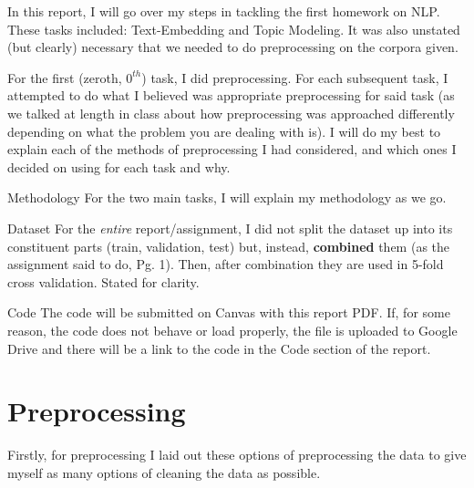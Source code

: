 \documentclass[12pt]{article}
\begin{document}
\maketitlepage

In this report, I will go over my steps in tackling the first homework on NLP. These tasks included: 
Text-Embedding and Topic Modeling. It was also unstated (but clearly) necessary that we needed to do 
preprocessing on the corpora given.

For the first (zeroth, $0^{th}$) task, I did preprocessing. For each subsequent task, I attempted to do what I 
believed was appropriate preprocessing for said task (as we talked at length in class about how 
preprocessing was approached differently depending on what the problem you are dealing with is). I will 
do my best to explain each of the methods of preprocessing I had considered, and which ones I decided on 
using for each task and why.

\begin{aside}{Methodology}
For the two main tasks, I will explain my methodology as we go. 
\end{aside}

\begin{important}{Dataset}
    For the \textit{entire} report/assignment, I did not split the dataset up into its constituent parts 
    (train, validation, test) but, instead, \textbf{combined} them (as the assignment said to do, Pg. 1). Then, after combination 
    they are used in 5-fold cross validation. Stated for clarity.
\end{important}

\begin{aside}{Code}
    The code will be submitted on Canvas with this report PDF. If, for some reason, the code does not 
    behave or load properly, the file is uploaded to Google Drive and there will be a link to the code 
    in the Code section of the report.
\end{aside}


\newpage
\section*{Preprocessing}

Firstly, for preprocessing I laid out these options of preprocessing the data to give myself as many options 
of cleaning the data as possible.
\end{document}
